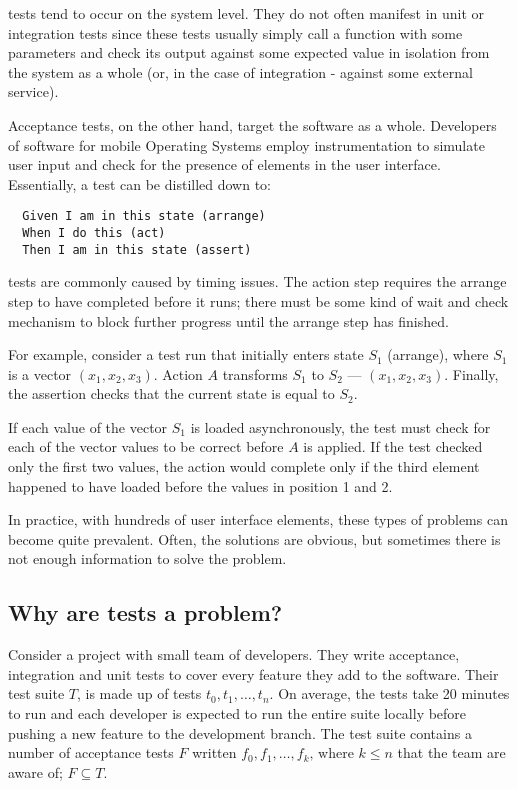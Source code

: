 \Flaky tests tend to occur on the system level. They do not often manifest in
unit or integration tests since these tests usually simply call a function with
some parameters and check its output against some expected value in isolation
from the system as a whole (or, in the case of integration - against some
external service).

Acceptance tests, on the other hand, target the software as a whole. Developers
of software for mobile Operating Systems employ instrumentation to simulate user
input and check for the presence of elements in the user interface. Essentially,
a test can be distilled down to:
\begin{verbatim}
  Given I am in this state (arrange)
  When I do this (act)
  Then I am in this state (assert)
\end{verbatim}

\Flaky tests are commonly caused by timing issues. The action step requires the
arrange step to have completed before it runs; there must be some kind of wait
and check mechanism to block further progress until the arrange step has
finished.

For example, consider a test run that initially enters state $S_{1}$ (arrange),
where $S_{1}$ is a vector $(x_{1},x_{2},x_{3})$. Action $A$ transforms $S_1$ to
$S_2$ --- $(x_{1},x_{2},x_{3})$. Finally, the assertion checks that the current
state is equal to $S_2$.

If each value of the vector $S_{1}$ is loaded asynchronously, the test must
check for each of the vector values to be correct before $A$ is applied. If the
test checked only the first two values, the action would complete only if the
third element happened to have loaded before the values in position 1 and 2.

In practice, with hundreds of user interface elements, these types of problems
can become quite prevalent. Often, the solutions are obvious, but sometimes
there is not enough information to solve the problem.


\subsection{Why are \flaky tests a problem?}

Consider a project with small team of developers. They write acceptance,
integration and unit tests to cover every feature they add to the software.
Their test suite $T$, is made up of tests $t_{0}, t_{1}, \dots, t_{n}$. On
average, the tests take 20 minutes to run and each developer is expected to run
the entire suite locally before pushing a new feature to the development branch.
The test suite contains a number of \flaky acceptance tests $F$ written $f_{0},
f_{1}, \dots, f_{k} \text{, where $k \leq n$}$ that the team are aware of; $F
\subseteq T$.

